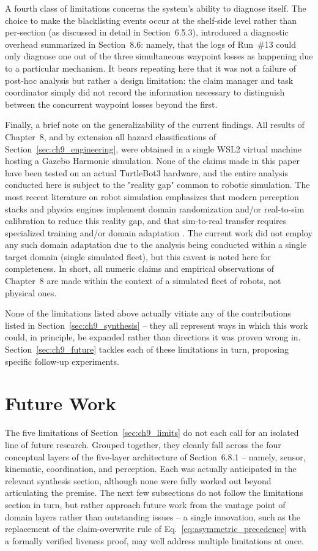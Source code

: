 A fourth class of limitations concerns the system's ability to diagnose itself. The choice to make the blacklisting events occur at the shelf-side level rather than per-section (as discussed in detail in Section~6.5.3), introduced a diagnostic overhead summarized in Section~8.6: namely, that the logs of Run~\#13 could only diagnose one out of the three simultaneous waypoint losses as happening due to a particular mechanism. It bears repeating here that it was not a failure of post-hoc analysis but rather a design limitation: the claim manager and task coordinator simply did not record the information necessary to distinguish between the concurrent waypoint losses beyond the first.

Finally, a brief note on the generalizability of the current findings. All results of Chapter~8, and by extension all hazard classifications of Section~\ref{sec:ch9_engineering}, were obtained in a single WSL2 virtual machine hosting a Gazebo Harmonic simulation. None of the claims made in this paper have been tested on an actual TurtleBot3 hardware, and the entire analysis conducted here is subject to the "reality gap" common to robotic simulation. The most recent literature on robot simulation emphasizes that modern perception stacks and physics engines implement domain randomization and/or real-to-sim calibration to reduce this reality gap, and that sim-to-real transfer requires specialized training and/or domain adaptation \cite{aljalbout2026reality}. The current work did not employ any such domain adaptation due to the analysis being conducted within a single target domain (single simulated fleet), but this caveat is noted here for completeness. In short, all numeric claims and empirical observations of Chapter~8 are made within the context of a simulated fleet of robots, not physical ones.

None of the limitations listed above actually vitiate any of the contributions listed in Section~\ref{sec:ch9_synthesis} -- they all represent ways in which this work could, in principle, be expanded rather than directions it was proven wrong in. Section~\ref{sec:ch9_future} tackles each of these limitations in turn, proposing specific follow-up experiments.

\section{Future Work\label{sec:ch9_future}}

The five limitations of Section~\ref{sec:ch9_limits} do not each call for an isolated line of future research. Grouped together, they cleanly fall across the four conceptual layers of the five-layer architecture of Section~6.8.1 -- namely, sensor, kinematic, coordination, and perception. Each was actually anticipated in the relevant synthesis section, although none were fully worked out beyond articulating the premise. The next few subsections do not follow the limitations section in turn, but rather approach future work from the vantage point of domain layers rather than outstanding issues -- a single innovation, such as the replacement of the claim-overwrite rule of Eq.~\eqref{eq:asymmetric_precedence} with a formally verified liveness proof, may well address multiple limitations at once.

